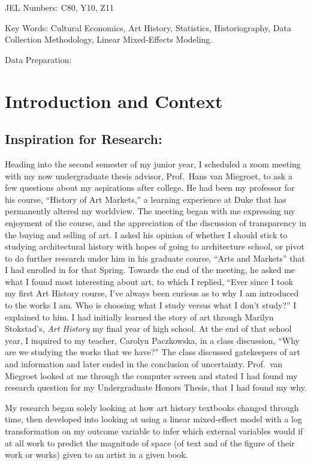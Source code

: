 \documentclass[
  letterpaper,
  DIV=11,
  numbers=noendperiod]{scrreprt}
\begin{document}
JEL Numbers: C80, Y10, Z11

Key Words: Cultural Economics, Art History, Statistics, Historiography,
Data Collection Methodology, Linear Mixed-Effects Modeling.

Data Preparation:

\hypertarget{introduction-and-context}{%
\section{Introduction and Context}\label{introduction-and-context}}

\hypertarget{inspiration-for-research}{%
\subsection{Inspiration for Research:}\label{inspiration-for-research}}

Heading into the second semester of my junior year, I scheduled a zoom
meeting with my now undergraduate thesis advisor, Prof.~Hans van
Miegroet, to ask a few questions about my aspirations after college. He
had been my professor for his course, ``History of Art Markets,'' a
learning experience at Duke that has permanently altered my worldview.
The meeting began with me expressing my enjoyment of the course, and the
appreciation of the discussion of transparency in the buying and selling
of art. I asked his opinion of whether I should stick to studying
architectural history with hopes of going to architecture school, or
pivot to do further research under him in his graduate course, ``Arts
and Markets'' that I had enrolled in for that Spring. Towards the end of
the meeting, he asked me what I found most interesting about art, to
which I replied, ``Ever since I took my first Art History course, I've
always been curious as to why I am introduced to the works I am. Who is
choosing what I study versus what I don't study?'' I explained to him. I
had initially learned the story of art through Marilyn Stokstad's,
\emph{Art History} my final year of high school. At the end of that
school year, I inquired to my teacher, Carolyn Paczkowska, in a class
discussion, ``Why are we studying the works that we have?'' The class
discussed gatekeepers of art and information and later ended in the
conclusion of uncertainty. Prof.~van Miegroet looked at me through the
computer screen and stated I had found my research question for my
Undergraduate Honors Thesis, that I had found my why.

My research began solely looking at how art history textbooks changed
through time, then developed into looking at using a linear mixed-effect
model with a log transformation on my outcome variable to infer which
external variables would if at all work to predict the magnitude of
space (of text and of the figure of their work or works) given to an
artist in a given book.
\end{document}
